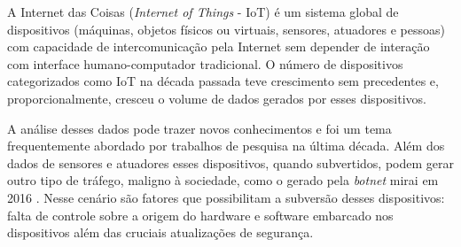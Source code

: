 

% 
% 



A Internet das Coisas (\emph{Internet of Things} - IoT) é um sistema global de dispositivos
(máquinas, objetos físicos ou virtuais, sensores, atuadores e pessoas) com capacidade de intercomunicação pela Internet sem depender
de interação com interface humano-computador tradicional.
O número de dispositivos categorizados como IoT na década passada teve crescimento
sem precedentes e, proporcionalmente, cresceu o volume de  dados gerados por esses dispositivos.

A análise desses dados pode trazer novos conhecimentos e foi um tema frequentemente
abordado por trabalhos de pesquisa na última década.
Além dos
dados de sensores e atuadores esses dispositivos, quando subvertidos, podem
gerar outro tipo de tráfego, maligno à sociedade, como o gerado pela
\emph{botnet} mirai em 2016 \cite{Kambourakis2017}. Nesse cenário são fatores
que possibilitam a subversão desses dispositivos: falta de controle sobre a origem do hardware e
software embarcado nos dispositivos além das cruciais atualizações de segurança.

